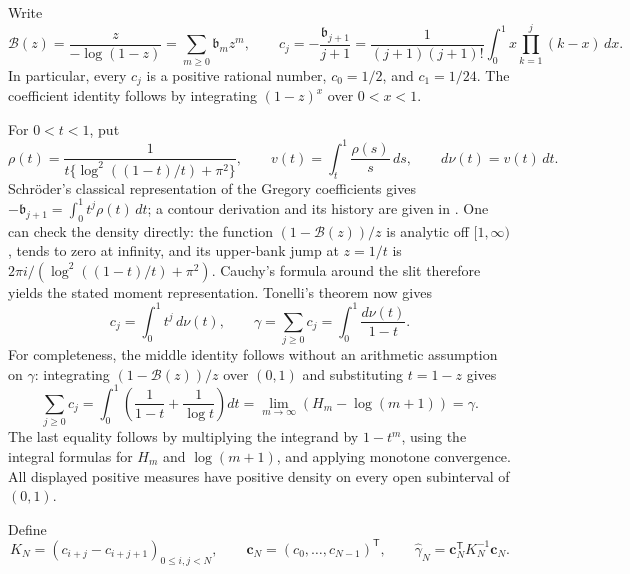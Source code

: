 \documentclass[11pt,a4paper]{article}
\theoremstyle{definition}
\theoremstyle{remark}
\numberwithin{equation}{section}
\begin{document}
Write
\begin{equation}\label{pm:ht:moments}
 \mathscr B(z)=\frac{z}{-\log(1-z)}=\sum_{m\geq0}\mathfrak b_mz^m,
 \qquad c_j=-\frac{\mathfrak b_{j+1}}{j+1}
 =\frac{1}{(j+1)(j+1)!}
   \int_0^1x\prod_{k=1}^j(k-x)\,dx.
\end{equation}
In particular, every $c_j$ is a positive rational number,
$c_0=1/2$, and $c_1=1/24$.  The coefficient identity follows by
integrating $(1-z)^x$ over $0<x<1$.

For $0<t<1$, put
\begin{equation}\label{pm:ht:measure}
 \rho(t)=\frac{1}{t\{\log^2((1-t)/t)+\pi^2\}},\qquad
 v(t)=\int_t^1\frac{\rho(s)}s\,ds,\qquad d\nu(t)=v(t)\,dt.
\end{equation}
Schr\"oder's classical representation of the Gregory coefficients gives
$-\mathfrak b_{j+1}=\int_0^1t^j\rho(t)\,dt$; a contour derivation and its history
are given in \cite{pm:Blagouchine2017}.  One can check the density directly:
the function $(1-\mathscr B(z))/z$ is analytic off $[1,\infty)$, tends to zero
at infinity, and its upper-bank jump at $z=1/t$ is
$2\pi i/(\log^2((1-t)/t)+\pi^2)$.  Cauchy's formula around the slit
therefore yields the stated moment representation.  Tonelli's theorem
now gives
\begin{equation}\label{pm:ht:gamma-markov}
 c_j=\int_0^1t^j\,d\nu(t),\qquad
 \gamma=\sum_{j\geq0}c_j
       =\int_0^1\frac{d\nu(t)}{1-t}.
\end{equation}
For completeness, the middle identity follows without an arithmetic
assumption on $\gamma$: integrating $(1-\mathscr B(z))/z$ over $(0,1)$ and
substituting $t=1-z$ gives
\[
 \sum_{j\geq0}c_j
 =\int_0^1\left(\frac1{1-t}+\frac1{\log t}\right)dt
 =\lim_{m\to\infty}(H_m-\log(m+1))=\gamma.
\]
The last equality follows by multiplying the integrand by $1-t^m$,
using the integral formulas for $H_m$ and $\log(m+1)$, and applying
monotone convergence.  All displayed positive measures have positive
density on every open subinterval of $(0,1)$.

Define
\begin{equation}\label{pm:ht:gram}
 K_N=(c_{i+j}-c_{i+j+1})_{0\leq i,j<N},\qquad
 \boldsymbol c_N=(c_0,\ldots,c_{N-1})^{\mathsf T},\qquad
 \widehat\gamma_N=\boldsymbol c_N^{\mathsf T}K_N^{-1}\boldsymbol c_N.
\end{equation}
\end{document}
